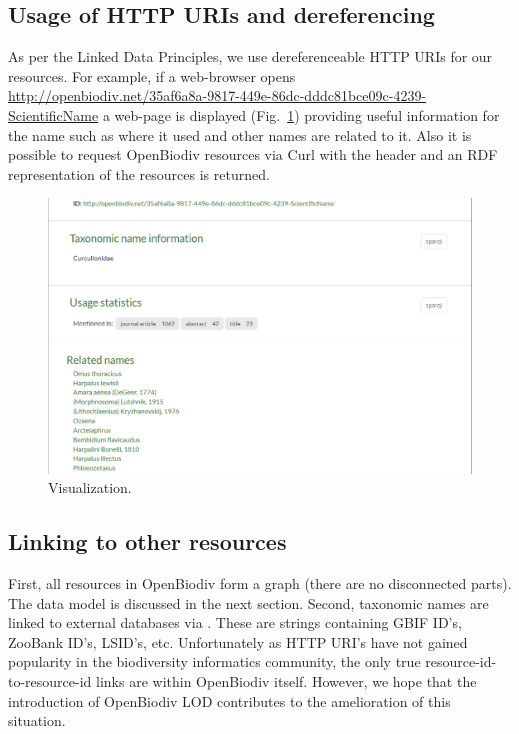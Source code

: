 \subsection{Usage of HTTP URIs and dereferencing}

As per the Linked Data Principles, we use dereferenceable HTTP URIs for our resources. For example, if a web-browser opens\\\url{http://openbiodiv.net/35af6a8a-9817-449e-86dc-dddc81bce09c-4239-ScientificName} a web-page is displayed (Fig.~\ref{fig:portal-name-visualization}) providing useful information for the name such as where it used and other names are related to it. Also it is possible to request OpenBiodiv resources via Curl with the header  and an RDF representation of the resources is returned.

\begin{figure}
\centering
\includegraphics[width=\textwidth]{Figures/portal-name-visualization}
\decoRule
\caption{Visualization.}
\label{fig:portal-name-visualization}
\end{figure}

\subsection{Linking to other resources}

First, all resources in OpenBiodiv form a graph (there are no disconnected parts). The data model is discussed in the next section. Second, taxonomic names are linked to external databases via . These are strings containing GBIF ID's, ZooBank ID's, LSID's, etc. Unfortunately as HTTP URI's have not gained popularity in the biodiversity informatics community, the only true resource-id-to-resource-id links are within OpenBiodiv itself. However, we hope that the introduction of OpenBiodiv LOD contributes to the amelioration of this situation.


